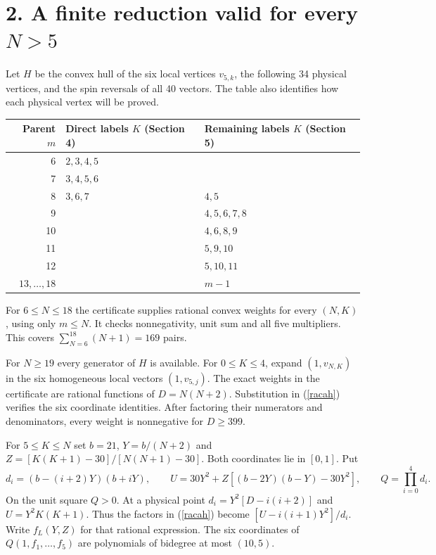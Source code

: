 \documentclass[11pt,a4paper]{article}
\begin{document}
\section*{2. A finite reduction valid for every $N>5$}
Let $H$ be the convex hull of the six local vertices $v_{5,k}$, the following 34 physical vertices, and the spin reversals of all 40 vectors. The table also identifies how each physical vertex will be proved.
\begin{center}\begin{tabular}{rll}\toprule
Parent $m$ & Direct labels $K$ (Section 4) & Remaining labels $K$ (Section 5)\\\midrule
6 & $2,3,4,5$ & \\
7 & $3,4,5,6$ & \\
8 & $3,6,7$ & $4,5$\\
9 & & $4,5,6,7,8$\\
10 & & $4,6,8,9$\\
11 & & $5,9,10$\\
12 & & $5,10,11$\\
$13,\ldots,18$ & & $m-1$\\\bottomrule\end{tabular}\end{center}
For $6\le N\le18$ the certificate supplies rational convex weights for every $(N,K)$, using only $m\le N$. It checks nonnegativity, unit sum and all five multipliers. This covers $\sum_{N=6}^{18}(N+1)=169$ pairs.

For $N\ge19$ every generator of $H$ is available. For $0\le K\le4$, expand $(1,v_{N,K})$ in the six homogeneous local vectors $(1,v_{5,j})$. The exact weights in the certificate are rational functions of $D=N(N+2)$. Substitution in (\ref{racah}) verifies the six coordinate identities. After factoring their numerators and denominators, every weight is nonnegative for $D\ge399$.

For $5\le K\le N$ set $b=21$, $Y=b/(N+2)$ and $Z=[K(K+1)-30]/[N(N+1)-30]$. Both coordinates lie in $[0,1]$. Put
\[
 d_i=(b-(i+2)Y)(b+iY),\qquad U=30Y^2+Z[(b-2Y)(b-Y)-30Y^2],\qquad Q=\prod_{i=0}^4d_i.
\]
On the unit square $Q>0$. At a physical point $d_i=Y^2[D-i(i+2)]$ and $U=Y^2 K(K+1)$. Thus the factors in (\ref{racah}) become $[U-i(i+1)Y^2]/d_i$. Write $f_L(Y,Z)$ for that rational expression. The six coordinates of $Q(1,f_1,\ldots,f_5)$ are polynomials of bidegree at most $(10,5)$.
\end{document}
